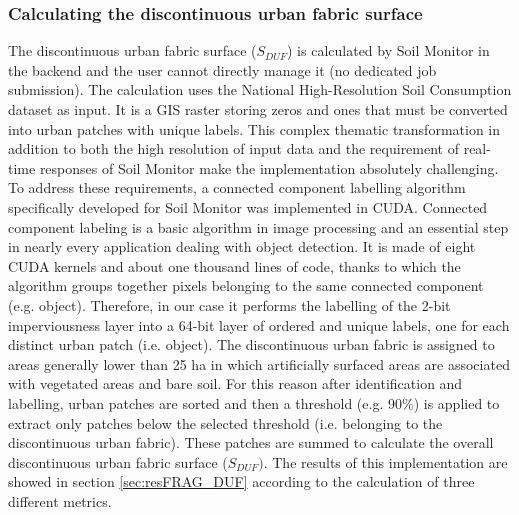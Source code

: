 \documentclass[APA,LATO1COL,doublespace]{WileyNJD-v2}
\begin{document}
\subsubsection{ Calculating the discontinuous urban fabric surface }
\label{sec:mmDUF}
The discontinuous urban fabric surface ($S_{DUF}$) is calculated by Soil Monitor in the backend and the user cannot directly manage it (no dedicated job submission). %
The calculation uses the National High-Resolution Soil Consumption dataset as input. It is a GIS raster storing zeros and ones that must be converted into urban patches with unique labels.
This complex thematic transformation in addition to both the high resolution of input data and the requirement of real-time responses of Soil Monitor make the implementation absolutely challenging.
To address these requirements, a connected component labelling algorithm specifically developed for Soil Monitor was implemented in CUDA.
Connected component labeling is a basic algorithm in image processing and an essential step in nearly every application dealing with object detection.
It is made of eight CUDA kernels and about one thousand lines of code, thanks to which the algorithm groups together pixels belonging to the same connected component (e.g. object).
Therefore, in our case it performs the labelling of the 2-bit imperviousness layer into a 64-bit layer of ordered and unique labels, one for each distinct urban patch (i.e. object).
The discontinuous urban fabric is assigned to areas generally lower than 25 ha in which artificially surfaced areas are associated with vegetated areas and bare soil.
For this reason after identification and labelling, urban patches are sorted and then a threshold (e.g. 90\%) is applied to extract only patches below the selected threshold (i.e. belonging to the discontinuous urban fabric).
These patches are summed to calculate the overall discontinuous urban fabric surface ($S_{DUF})$.
The results of this implementation are showed in section \ref{sec:resFRAG_DUF} according to the calculation of three different metrics.
\end{document}
